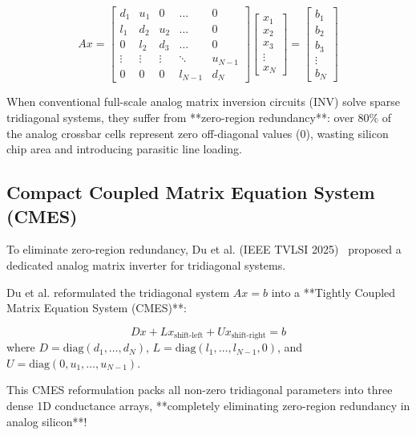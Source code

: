 \begin{equation}
A x = \begin{bmatrix}
d_1 & u_1 & 0 & \dots & 0 \\
l_1 & d_2 & u_2 & \dots & 0 \\
0 & l_2 & d_3 & \dots & 0 \\
\vdots & \vdots & \vdots & \ddots & u_{N-1} \\
0 & 0 & 0 & l_{N-1} & d_N
\end{bmatrix} \begin{bmatrix} x_1 \\ x_2 \\ x_3 \\ \vdots \\ x_N \end{bmatrix} = \begin{bmatrix} b_1 \\ b_2 \\ b_3 \\ \vdots \\ b_N \end{bmatrix}
\end{equation}

When conventional full-scale analog matrix inversion circuits (INV) solve sparse tridiagonal systems, they suffer from **zero-region redundancy**: over $80\%$ of the analog crossbar cells represent zero off-diagonal values ($0$), wasting silicon chip area and introducing parasitic line loading.

\subsection{Compact Coupled Matrix Equation System (CMES)}
To eliminate zero-region redundancy, Du et al. (IEEE TVLSI 2025)~\cite{du2025analog} proposed a dedicated analog matrix inverter for tridiagonal systems. 

Du et al. reformulated the tridiagonal system $A x = b$ into a **Tightly Coupled Matrix Equation System (CMES)**:

\begin{equation}
D x + L x_{\text{shift-left}} + U x_{\text{shift-right}} = b
\end{equation}
where $D = \text{diag}(d_1, \dots, d_N)$, $L = \text{diag}(l_1, \dots, l_{N-1}, 0)$, and $U = \text{diag}(0, u_1, \dots, u_{N-1})$.

This CMES reformulation packs all non-zero tridiagonal parameters into three dense 1D conductance arrays, **completely eliminating zero-region redundancy in analog silicon**!

